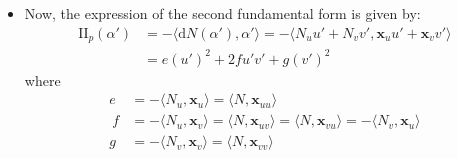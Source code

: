 \documentclass[10pt]{article}
\newcommand{\dee}{\mathrm{d}}
\newcommand{\ve}[1]{\mathbf{#1}}
\newcommand{\II}{\mathrm{II}}
\begin{document}
\begin{itemize}
    \item Now, the expression of the second fundamental form is given by:
    \begin{align*}
      \II_p(\alpha') 
      &= - \langle \dee N(\alpha'), \alpha' \rangle = -\langle N_u u' + N_v v', \ve{x}_u u' + \ve{x}_v v' \rangle\\
      &= e(u')^2 + 2f u'v' + g(v')^2
    \end{align*}
    where
    \begin{align*}
      e &= -\langle N_u, \ve{x}_u \rangle = \langle N, \ve{x}_{uu} \rangle\\\
      f &= -\langle N_u, \ve{x}_v \rangle = \langle N, \ve{x}_{uv} \rangle = \langle N, \ve{x}_{vu} \rangle = -\langle N_v, \ve{x}_u \rangle\\
      g &= -\langle N_v, \ve{x}_v \rangle = \langle N, \ve{x}_{vv} \rangle
    \end{align*}


\end{itemize}
\end{document}
